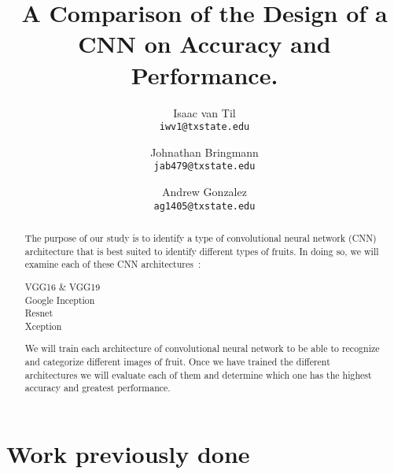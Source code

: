 \documentclass[10pt,letterpaper]{article}
\begin{document}
\title{A Comparison of the Design of a CNN on Accuracy and Performance.}

\author{Isaac van Til\\
{\tt\small iwv1@txstate.edu}
\and
Johnathan Bringmann\\
{\tt\small jab479@txstate.edu}
\and
Andrew Gonzalez\\
{\tt\small a\textunderscore g1405@txstate.edu}
}

\maketitle

\begin{abstract}
   The purpose of our study is to identify a type of convolutional neural network (CNN) architecture that is best suited to identify different types of fruits. In doing so, we will examine each of these CNN architectures~\cite{A1}: 
   \begin{center}
       VGG16 \& VGG19~\cite{A2}\\ Google Inception~\cite{A3}\\ Resnet~\cite{A4}\\ Xception~\cite{A6} 
   \end{center}
   We will train each architecture of convolutional neural network to be able to recognize and categorize different images of fruit. Once we have trained the different architectures we will evaluate each of them and determine which one has the highest accuracy and greatest performance.
\end{abstract}

\section{Work previously done}
\end{document}
